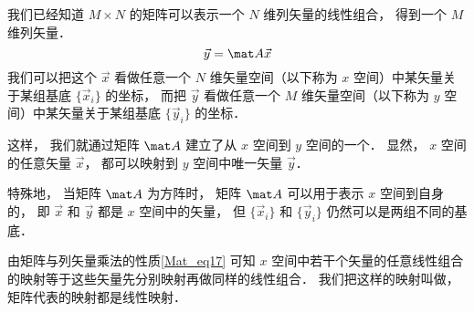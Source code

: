 

我们已经知道 $M\times N$ 的矩阵可以表示一个 $N$ 维列矢量的线性组合， 得到一个 $M$ 维列矢量．
\begin{equation}
\vec y = \mat A \vec x
\end{equation}
我们可以把这个 $\vec x$ 看做任意一个 $N$ 维矢量空间（以下称为 $x$ 空间）中某矢量关于某组基底 $\{\vec x_i\}$ 的坐标， 而把 $\vec y$ 看做任意一个 $M$ 维矢量空间（以下称为 $y$ 空间）中某矢量关于某组基底 $\{\vec y_i\}$ 的坐标．

这样， 我们就通过矩阵 $\mat A$ 建立了从 $x$ 空间到 $y$ 空间的一个． 显然， $x$ 空间的任意矢量 $\vec x$， 都可以映射到 $y$ 空间中唯一矢量 $\vec y$．

特殊地， 当矩阵 $\mat A$ 为方阵时， 矩阵 $\mat A$ 可以用于表示 $x$ 空间到自身的， 即 $\vec x$ 和 $\vec y$ 都是 $x$ 空间中的矢量， 但 $\{\vec x_i\}$ 和 $\{\vec y_i\}$ 仍然可以是两组不同的基底．

由矩阵与列矢量乘法的性质\autoref{Mat_eq17} 可知 $x$ 空间中若干个矢量的任意线性组合的映射等于这些矢量先分别映射再做同样的线性组合． 我们把这样的映射叫做， 矩阵代表的映射都是线性映射．

